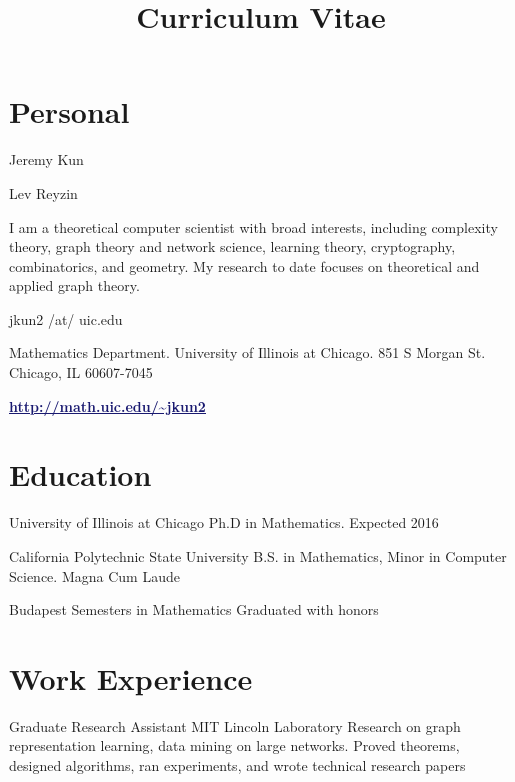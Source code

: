 \documentclass[11pt]{moderncv}
\title{Curriculum Vitae}
\begin{document}
   \maketitle

      \section{Personal}
         {Jeremy Kun}

         {Lev Reyzin}

         {I am a theoretical computer scientist with broad interests, including complexity theory, graph theory and network science, learning theory, cryptography, combinatorics, and geometry. My research to date focuses on theoretical and applied graph theory.}

         {jkun2 /at/ uic.edu}

         {Mathematics Department. University of Illinois at Chicago. 851 S Morgan St. Chicago, IL 60607-7045}

         {\href{http://math.uic.edu/~jkun2}{\textcolor{MidnightBlue}{\underline{\textbf{http://math.uic.edu/\textasciitilde{}jkun2}}}}}


   \section{Education}
         {University of Illinois at Chicago}
      {}
      {Ph.D in Mathematics.}
      {Expected 2016}
      {}

         {California Polytechnic State University}
      {}
      {B.S. in Mathematics, Minor in Computer Science.}
      {Magna Cum Laude}
      {}

         {Budapest Semesters in Mathematics}
      {}
{}
      {Graduated with honors}
      {}


   \section{Work Experience}
         {Graduate Research Assistant}
      {MIT Lincoln Laboratory}
      {}
      {}
      {Research on graph representation learning, data mining on large networks. Proved theorems, designed algorithms, ran experiments, and wrote technical research papers}
\end{document}
